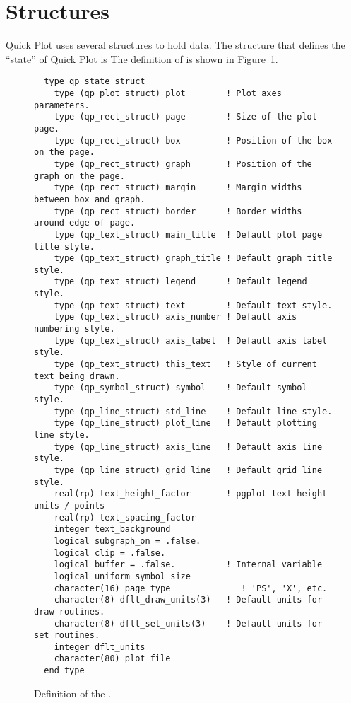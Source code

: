 \section{Structures}
\label{s:qp_structs}

Quick Plot uses several structures to hold data. The structure that
defines the ``state'' of Quick Plot is  The
definition of  is shown in
Figure~\ref{f:qp_state_struct}. 

\begin{figure}[htb]
\centering
\begin{verbatim}
  type qp_state_struct
    type (qp_plot_struct) plot        ! Plot axes parameters.
    type (qp_rect_struct) page        ! Size of the plot page.
    type (qp_rect_struct) box         ! Position of the box on the page.
    type (qp_rect_struct) graph       ! Position of the graph on the page.
    type (qp_rect_struct) margin      ! Margin widths between box and graph.
    type (qp_rect_struct) border      ! Border widths around edge of page.
    type (qp_text_struct) main_title  ! Default plot page title style.
    type (qp_text_struct) graph_title ! Default graph title style.
    type (qp_text_struct) legend      ! Default legend style.
    type (qp_text_struct) text        ! Default text style.
    type (qp_text_struct) axis_number ! Default axis numbering style.
    type (qp_text_struct) axis_label  ! Default axis label style.
    type (qp_text_struct) this_text   ! Style of current text being drawn.
    type (qp_symbol_struct) symbol    ! Default symbol style.
    type (qp_line_struct) std_line    ! Default line style.
    type (qp_line_struct) plot_line   ! Default plotting line style.
    type (qp_line_struct) axis_line   ! Default axis line style.
    type (qp_line_struct) grid_line   ! Default grid line style.
    real(rp) text_height_factor       ! pgplot text height units / points
    real(rp) text_spacing_factor 
    integer text_background 
    logical subgraph_on = .false.
    logical clip = .false.
    logical buffer = .false.          ! Internal variable
    logical uniform_symbol_size 
    character(16) page_type              ! 'PS', 'X', etc.
    character(8) dflt_draw_units(3)   ! Default units for draw routines.
    character(8) dflt_set_units(3)    ! Default units for set routines.
    integer dflt_units
    character(80) plot_file
  end type
\end{verbatim}
\caption{Definition of the .}
\label{f:qp_state_struct}
\end{figure}


